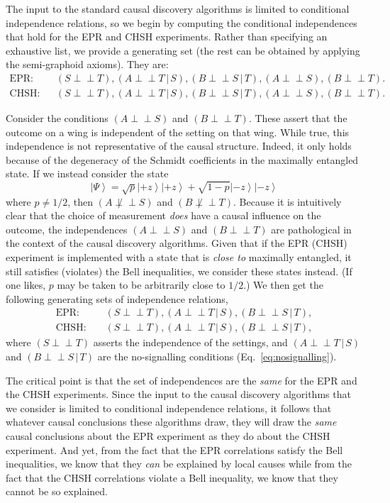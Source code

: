 \documentclass[letterpaper,onecolumn,nofootinbib]{revtex4}
\def\indep{\perp\!\!\!\!\perp}
\begin{document}
The input to the standard causal discovery algorithms is limited to
conditional independence relations, so we begin by computing the conditional
independences that hold for the EPR and CHSH experiments. Rather than
specifying an exhaustive list, we provide a generating set (the rest can be
obtained by applying the semi-graphoid axioms). They are:%
\begin{eqnarray*}
\text{EPR:} 	&&	(S\indep T),	(A\indep T\,|\,S),	(B\indep S\,|\,T),	
				(A\indep S), (B\indep T).				\\
\text{CHSH:}	&&	(S\indep T), 	(A\indep T\,|\,S),	(B\indep S\,|\,T), 
				(A\indep S), (B\indep T).			
\end{eqnarray*}%

Consider the conditions $(A\indep S)$ and $(B\indep T)$.
 These assert that the outcome on a wing is independent of the
setting on that wing. While true, this independence is not representative
of the causal structure. Indeed, it only holds because of the degeneracy
of the Schmidt coefficients in the maximally entangled state. If we instead consider the state
\[
\left\vert \Psi \right\rangle =\sqrt{p}\left\vert +z\right\rangle \left\vert
+z\right\rangle +\sqrt{1-p}\left\vert -z\right\rangle \left\vert
-z\right\rangle
\]
where $p\neq 1/2$, then $(A \not\indep S)$ and $(B \not\indep T)$.
Because it is intuitively clear that the choice of measurement \emph{does} have a causal
influence on the outcome, the independences $(A\indep S)$ and $(B\indep T)$ are pathological in the context
of the causal discovery algorithms. Given that if the EPR (CHSH)
experiment is implemented with a state that is \emph{close to} maximally entangled, it still satisfies
(violates) the Bell inequalities, we consider these states instead.  (If one
likes, $p$ may be taken to be arbitrarily close to $1/2$.)
We then get the following generating sets of independence relations,
\begin{eqnarray*}
\text{EPR: }	&&	\left( S\indep T\right) ,\left( A\indep T\,|\,S\right) ,\left( B\indep S\,|\,T\right), \label{EPRCIrelations}\\
\text{CHSH: }	&&	\left( S\indep T\right) ,\left( A\indep T\,|\,S\right) ,\left( B\indep S\,|\,T\right), \label{CHSHCIrelations}
\end{eqnarray*}%
where $\left( S\indep T\right) $ asserts the independence of the
settings, and $\left( A\indep T\,|\,S\right) $ and $\left( B\indep S\,|\,T\right) $
are the no-signalling conditions (Eq.~\eqref{eq:nosignalling}).  

The critical point is that the set of independences are the \emph{
same }for the EPR and the CHSH experiments. Since the input to the
causal discovery algorithms that we consider is limited to conditional
independence relations, it follows that whatever causal conclusions these
algorithms draw, they will draw the \emph{same} causal conclusions about the
EPR experiment as they do about the CHSH experiment. And yet, from the fact
that the EPR correlations satisfy the Bell inequalities, we know that they
\emph{can }be explained by local causes while from the fact that the CHSH
correlations violate a Bell inequality, we know that they cannot be so
explained.
\end{document}
